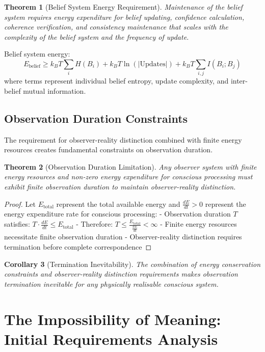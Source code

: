 \documentclass[12pt,a4paper]{article}
\newtheorem{theorem}{Theorem}[section]
\newtheorem{corollary}[theorem]{Corollary}
\begin{document}
\begin{theorem}[Belief System Energy Requirement]
 Maintenance of the belief system requires energy expenditure for belief updating, confidence calculation, coherence verification, and consistency maintenance that scales with the complexity of the belief system and the frequency of update.
\end{theorem}

Belief system energy:
\begin{equation}
E_{\text{belief}} \geq k_B T \sum_i H(B_i) + k_B T \ln(|\text{Updates}|) + k_B T \sum_{i,j} I(B_i; B_j)
\end{equation}
where terms represent individual belief entropy, update complexity, and inter-belief mutual information.

\subsection{Observation Duration Constraints}

The requirement for observer-reality distinction combined with finite energy resources creates fundamental constraints on observation duration.

\begin{theorem}[Observation Duration Limitation]
Any observer system with finite energy resources and non-zero energy expenditure for conscious processing must exhibit finite observation duration to maintain observer-reality distinction.
\end{theorem}

\begin{proof}
Let $E_{\text{total}}$ represent the total available energy and $\frac{dE}{dt} > 0$ represent the energy expenditure rate for conscious processing:
- Observation duration $T$ satisfies: $T \cdot \frac{dE}{dt} \leq E_{\text{total}}$
- Therefore: $T \leq \frac{E_{\text{total}}}{\frac{dE}{dt}} < \infty$
- Finite energy resources necessitate finite observation duration
- Observer-reality distinction requires termination before complete correspondence
\end{proof}

\begin{corollary}[Termination Inevitability]
The combination of energy conservation constraints and observer-reality distinction requirements makes observation termination inevitable for any physically realisable conscious system.
\end{corollary}

\section{The Impossibility of Meaning: Initial Requirements Analysis}
\end{document}
